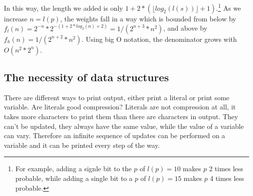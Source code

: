 \documentclass[oneside,hidelinks]{article}
\begin{document}
In this way, the length we added is only $1 + 2 * (\lfloor log_2(l(s)) \rfloor + 1)$.\footnote{For example, adding a signle bit to the $p$ of $l(p) = 10$ makes $p$ 2 times less probable, while adding a single bit to a $p$ of $l(p) = 15$ makes $p$ 4 times less probable.}
As we increase $n = l(p)$, the weights fall in a way which is bounded from below by $f_l(n) = 2^{-n} * 2^{-(1 + 2 * log_2(n) + 2)} = 1 / (2^{n+3} * n^2)$, and above by $f_h(n) = 1 / (2^{n+2} * n^2)$.
Using big O notation, the denominator grows with $O(n^2 * 2^{n})$.

\newpage

\thispagestyle{empty}

\begin{center}
\end{center}

\newpage

\subsection{The necessity of data structures}

There are different ways to print output, either print a literal or print some variable.
Are literals good compression?
Literals are not compression at all, it takes more characters to print them than there are characters in output.
They can't be updated, they always have the same value, while the value of a variable can vary.
Therefore an infinite sequence of updates can be performed on a variable and it can be printed every step of the way.
\end{document}
